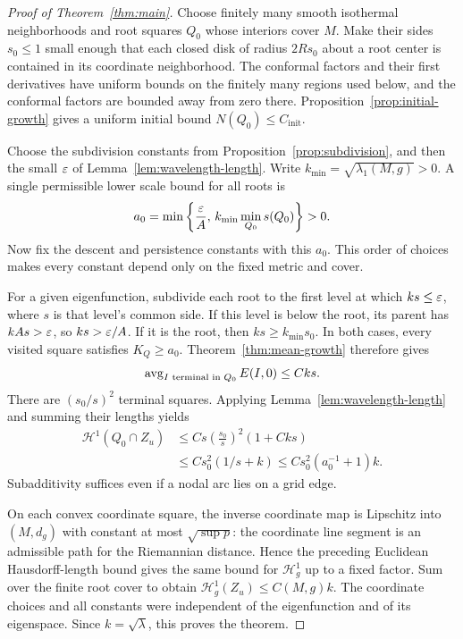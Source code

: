 \begin{proof}[Proof of Theorem~\ref{thm:main}]
Choose finitely many smooth isothermal neighborhoods and root
squares $Q_0$ whose interiors cover $M$. Make their sides
$s_0\le1$ small enough that each closed disk of radius $2Rs_0$
about a root center is contained in its coordinate neighborhood.
The conformal factors and their first derivatives have uniform
bounds on the finitely many regions used below, and the conformal
factors are bounded away from zero there. Proposition~\ref{prop:initial-growth}
gives a uniform initial bound $N(Q_0)\le C_{\mathrm{init}}$.

Choose the subdivision constants from
Proposition~\ref{prop:subdivision}, and then the small
$\varepsilon$ of Lemma~\ref{lem:wavelength-length}. Write
$k_{\min}=\sqrt{\lambda_1(M,g)}>0$. A single permissible lower
scale bound for all roots is
\[
 a_0=\min\left\{\frac{\varepsilon}{A},\,
           k_{\min}\min_{Q_0}s(Q_0)\right\}>0.
\]
Now fix the descent and persistence constants with this $a_0$.
This order of choices makes every constant depend only on the
fixed metric and cover.

For a given eigenfunction, subdivide each root to the first level
at which $ks\le\varepsilon$, where $s$ is that level's common side.
If this level is below the root, its parent has $kAs>\varepsilon$, so
$ks>\varepsilon/A$. If it is the root, then $ks\ge k_{\min}s_0$.
In both cases, every visited square satisfies $K_Q\ge a_0$.
Theorem~\ref{thm:mean-growth} therefore gives
\[
 \operatorname{avg}_{I\text{ terminal in }Q_0}E(I,0)\le Cks.
\]
There are $(s_0/s)^2$ terminal squares. Applying
Lemma~\ref{lem:wavelength-length} and summing their lengths yields
\begin{align*}
 \mathcal H^1(Q_0\cap Z_u)
 &\le Cs\left(\frac{s_0}{s}\right)^2(1+Cks)\\
 &\le Cs_0^2(1/s+k)
 \le Cs_0^2(a_0^{-1}+1)k.
\end{align*}
Subadditivity suffices even if a nodal arc lies on a grid edge.

On each convex coordinate square, the inverse coordinate map is
Lipschitz into $(M,d_g)$ with constant at most
$\sqrt{\sup p}$: the coordinate line segment is an admissible
path for the Riemannian distance. Hence the preceding Euclidean
Hausdorff-length bound gives the same bound for $\mathcal H_g^1$
up to a fixed factor. Sum over the finite root cover to obtain
$\mathcal H_g^1(Z_u)\le C(M,g)k$.
The coordinate choices and all constants were independent of
the eigenfunction and of its eigenspace. Since $k=\sqrt\lambda$,
this proves the theorem.
\end{proof}
